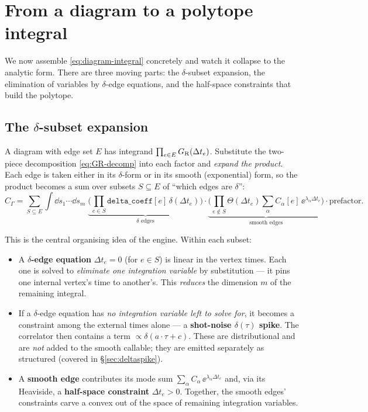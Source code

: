 \section{From a diagram to a polytope integral}\label{sec:polytope}

We now assemble \eqref{eq:diagram-integral} concretely and watch it collapse to
the analytic form. There are three moving parts: the $\delta$-subset expansion,
the elimination of variables by $\delta$-edge equations, and the half-space
constraints that build the polytope.

\subsection{The $\delta$-subset expansion}

A diagram with edge set $E$ has integrand $\prod_{e\in E}G_{\mathrm R}(\Delta t_e)$.
Substitute the two-piece decomposition \eqref{eq:GR-decomp} into each factor and
\emph{expand the product}. Each edge is taken either in its $\delta$-form or in
its smooth (exponential) form, so the product becomes a sum over subsets
$S\subseteq E$ of ``which edges are $\delta$'':
\begin{equation}
  C_\Gamma = \sum_{S\subseteq E}\int \dd s_1\cdots \dd s_m\;
    \underbrace{\Big(\prod_{e\in S}\texttt{delta\_coeff}[e]\,\delta(\Delta t_e)\Big)}_{\delta\text{ edges}}
    \cdot
    \underbrace{\Big(\prod_{e\notin S}\Theta(\Delta t_e)\sum_\alpha C_\alpha[e]\,\ee^{\lambda_\alpha \Delta t_e}\Big)}_{\text{smooth edges}}
    \cdot \text{prefactor}.
  \label{eq:subset-sum}
\end{equation}

This is the central organising idea of the engine. Within each subset:

\begin{itemize}
  \item A \textbf{$\delta$-edge equation} $\Delta t_e = 0$ (for $e\in S$) is
        linear in the vertex times. Each one is solved to \emph{eliminate one
        integration variable} by substitution --- it pins one internal vertex's
        time to another's. This \emph{reduces} the dimension $m$ of the remaining
        integral.
  \item If a $\delta$-edge equation has \emph{no integration variable left to
        solve for}, it becomes a constraint among the external times alone --- a
        \textbf{shot-noise $\delta(\tau)$ spike}. The correlator then contains a
        term $\propto \delta(a\cdot\tau + c)$. These are distributional and are
        \emph{not} added to the smooth callable; they are emitted separately as
        structured  (covered in
        \S\ref{sec:deltaspike}).
  \item A \textbf{smooth edge} contributes its mode sum
        $\sum_\alpha C_\alpha\,\ee^{\lambda_\alpha \Delta t_e}$ and, via its
        Heaviside, a \textbf{half-space constraint} $\Delta t_e > 0$. Together,
        the smooth edges' constraints carve a convex  out of the
        space of remaining integration variables.
\end{itemize}

